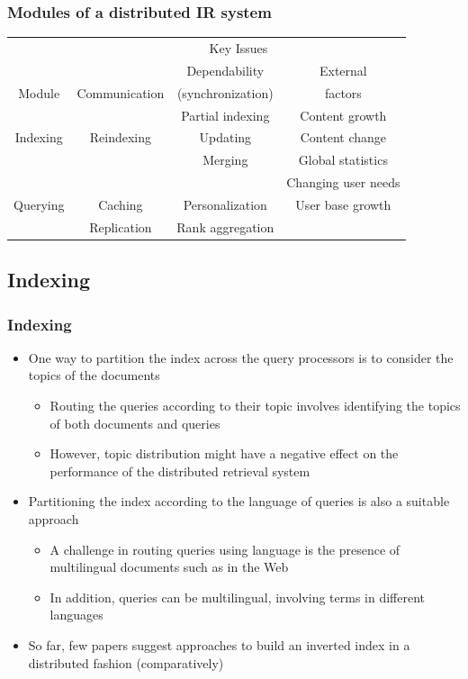 \documentclass{beamer}
\begin{document}
\begin{frame}
    \frametitle{Modules of a distributed IR system}
    
    \centering
    \footnotesize
    \begin{tabular}{|c|ccc|}\hline
      & \multicolumn{3}{|c|}{Key Issues}\\\cline{2-4}
       &  & Dependability & External \\
      Module & Communication & (synchronization) & factors \\\hline\hline
      & & Partial indexing & Content growth \\
      Indexing & Reindexing & Updating & Content change \\
      & & Merging & Global statistics \\\hline
      &  & & Changing user needs \\
      Querying & Caching & Personalization & User base growth \\
      & Replication & Rank aggregation  & \\\hline
    \end{tabular}
\end{frame}

\subsection{Indexing}

\begin{frame}
    \frametitle{Indexing}
    \begin{itemize}
    \item One way to partition the index across the query processors is to
        consider the topics of the documents
        \begin{itemize}
        \item Routing the queries according to their topic involves identifying
            the topics of both documents and queries
        \item However, topic distribution might have a negative effect on the
            performance of the distributed retrieval system
        \end{itemize}
    \item Partitioning the index according to the language of queries is also a
        suitable approach
        \begin{itemize}
        \item A challenge in routing queries using language is the presence of
            multilingual documents such as in the Web
        \item In addition, queries can be multilingual, involving terms in
            different languages
        \end{itemize}
    \item So far, few papers suggest approaches to build an inverted index
        in a distributed fashion (comparatively)
    \end{itemize}
\end{frame}
\end{document}
